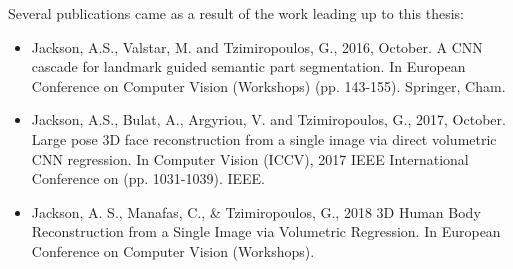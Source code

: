 \begin{publications}
  Several publications came as a result of the work leading up to this
  thesis:

  \begin{itemize}
  \item Jackson, A.S., Valstar, M. and Tzimiropoulos, G., 2016,
    October. A CNN cascade for landmark guided semantic part
    segmentation. In European Conference on Computer Vision (Workshops)
    (pp. 143-155). Springer, Cham.

  \item Jackson, A.S., Bulat, A., Argyriou, V. and Tzimiropoulos, G.,
    2017, October. Large pose 3D face reconstruction from a single
    image via direct volumetric CNN regression. In Computer Vision
    (ICCV), 2017 IEEE International Conference on
    (pp. 1031-1039). IEEE.

  \item Jackson, A. S., Manafas, C., \& Tzimiropoulos, G., 2018 3D
    Human Body Reconstruction from a Single Image via Volumetric
    Regression. In European Conference on Computer Vision (Workshops).
  \end{itemize}
\end{publications}


